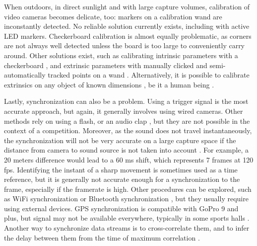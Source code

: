 When outdoors, in direct sunlight and with large capture volumes, calibration of video cameras becomes delicate, too: markers on a calibration wand are inconstantly detected. No reliable solution currently exists, including with active LED markers. Checkerboard calibration is almost equally problematic, as corners are not always well detected unless the board is too large to conveniently carry around. Other solutions exist, such as calibrating intrinsic parameters with a checkerboard \cite{Zhang2000}, and extrinsic parameters with manually clicked and semi-automatically tracked points on a wand \cite{Argus,Jackson2016}. 
Alternatively, it is possible to calibrate extrinsics on any object of known dimensions \cite{Dawson-Howe1994}, be it a human being \cite{Liu2022a}.

Lastly, synchronization can also be a problem. Using a trigger signal is the most accurate approach, but again, it generally involves using wired cameras. Other methods rely on using a flash, or an audio clap \cite{Jackson2016}, but they are not possible in the context of a competition. Moreover, as the sound does not travel instantaneously, the synchronization will not be very accurate on a large capture space if the distance from camera to sound source is not taken into account \cite{Hasler2009}. For example, a 20 meters difference would lead to a 60 ms shift, which represents 7 frames at 120 fps. Identifying the instant of a sharp movement is sometimes used as a time reference, but it is generally not accurate enough for a synchronization to the frame, especially if the framerate is high. Other procedures can be explored, such as WiFi synchronization \cite{Romanov2019} or Bluetooth synchronization \cite{Asgarian2022}, but they usually require using external devices. GPS synchronization is compatible with GoPro 9 and plus, but signal may not be available everywhere, typically in some sports halls \cite{GoPro2022}. Another way to synchronize data streams is to cross-correlate them, and to infer the delay between them from the time of maximum correlation \cite{Plotz2012}. 


